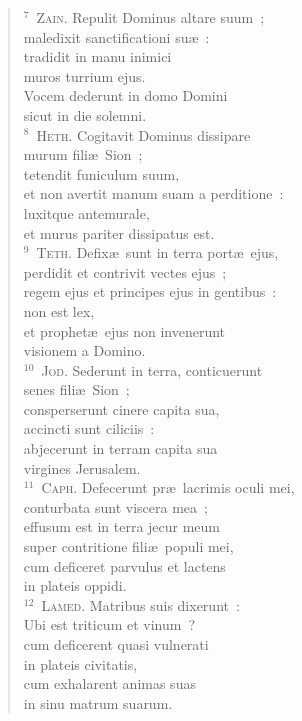 \begin{flushleft}
\begin{verse}
${}^{7}$~\textsc{Zain.} Repulit Dominus altare suum~;\\ maledixit sanctificationi su\ae~:\\ tradidit in manu inimici\\ muros turrium ejus.\\ Vocem dederunt in domo Domini\\ sicut in die solemni.\\
${}^{8}$~\textsc{Heth.} Cogitavit Dominus dissipare\\ murum fili\ae\ Sion~;\\ tetendit funiculum suum,\\ et non avertit manum suam a perditione~:\\ luxitque antemurale,\\ et murus pariter dissipatus est.\\
${}^{9}$~\textsc{Teth.} Defix\ae\ sunt in terra port\ae\ ejus,\\ perdidit et contrivit vectes ejus~;\\ regem ejus et principes ejus in gentibus~:\\ non est lex,\\ et prophet\ae\ ejus non invenerunt\\ visionem a Domino.\\
${}^{10}$~\textsc{Jod.} Sederunt in terra, conticuerunt\\ senes fili\ae\ Sion~;\\ consperserunt cinere capita sua,\\ accincti sunt ciliciis~:\\ abjecerunt in terram capita sua\\ virgines Jerusalem.\\
${}^{11}$~\textsc{Caph.} Defecerunt pr\ae\ lacrimis oculi mei,\\ conturbata sunt viscera mea~;\\ effusum est in terra jecur meum\\ super contritione fili\ae\ populi mei,\\ cum deficeret parvulus et lactens\\ in plateis oppidi.\\
${}^{12}$~\textsc{Lamed.} Matribus suis dixerunt~:\\ Ubi est triticum et vinum~?\\ cum deficerent quasi vulnerati\\ in plateis civitatis,\\ cum exhalarent animas suas\\ in sinu matrum suarum.\\

\end{verse}
\end{flushleft}
